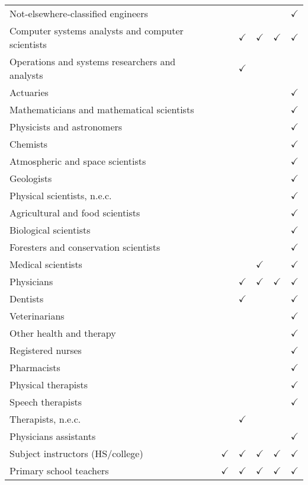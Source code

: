 \begin{tabular}[t]{llllll}
Not-elsewhere-classified engineers &  &  &  &  & $\checkmark$\\
Computer systems analysts and computer scientists &  & $\checkmark$ & $\checkmark$ & $\checkmark$ & $\checkmark$\\
Operations and systems researchers and analysts &  & $\checkmark$ &  &  & \\
Actuaries &  &  &  &  & $\checkmark$\\
Mathematicians and mathematical scientists &  &  &  &  & $\checkmark$\\
Physicists and astronomers &  &  &  &  & $\checkmark$\\
Chemists &  &  &  &  & $\checkmark$\\
Atmospheric and space scientists &  &  &  &  & $\checkmark$\\
Geologists &  &  &  &  & $\checkmark$\\
Physical scientists, n.e.c. &  &  &  &  & $\checkmark$\\
Agricultural and food scientists &  &  &  &  & $\checkmark$\\
Biological scientists &  &  &  &  & $\checkmark$\\
Foresters and conservation scientists &  &  &  &  & $\checkmark$\\
Medical scientists &  &  & $\checkmark$ &  & $\checkmark$\\
Physicians &  & $\checkmark$ & $\checkmark$ & $\checkmark$ & $\checkmark$\\
Dentists &  & $\checkmark$ &  &  & $\checkmark$\\
Veterinarians &  &  &  &  & $\checkmark$\\
Other health and therapy &  &  &  &  & $\checkmark$\\
Registered nurses &  &  &  &  & $\checkmark$\\
Pharmacists &  &  &  &  & $\checkmark$\\
Physical therapists &  &  &  &  & $\checkmark$\\
Speech therapists &  &  &  &  & $\checkmark$\\
Therapists, n.e.c. &  & $\checkmark$ &  &  & \\
Physicians assistants &  &  &  &  & $\checkmark$\\
Subject instructors (HS/college) & $\checkmark$ & $\checkmark$ & $\checkmark$ & $\checkmark$ & $\checkmark$\\
Primary school teachers & $\checkmark$ & $\checkmark$ & $\checkmark$ & $\checkmark$ & $\checkmark$\\

\end{tabular}
